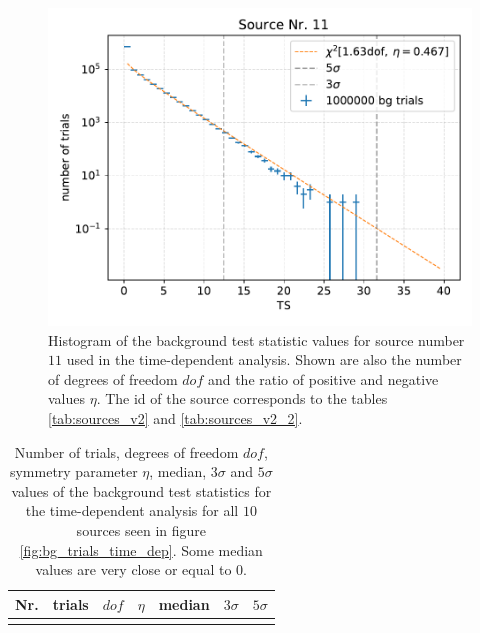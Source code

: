 \begin{figure}
    \centering
    \includegraphics[width=\linewidth]{Plots/05_csky/9_years_gfu_gold_time_dep_bg_t0_1.pdf}
    \caption{Histogram of the background test statistic values for source number $\num{11}$ used in the time-dependent analysis. Shown are also the number of degrees of freedom $dof$ and the ratio of positive and negative values $\eta$. The id of the source corresponds to the tables \ref{tab:sources_v2} and \ref{tab:sources_v2_2}.}
    \label{fig:bg_trials_time_dep_1}
\end{figure}
\begin{table}
  \centering
  \caption[]{Number of trials, degrees of freedom $dof$, symmetry parameter $\eta$, median, $\num{3}\sigma$ and $\num{5}\sigma$ values of the background test statistics for the time-dependent analysis for all $\num{10}$ sources seen in figure \ref{fig:bg_trials_time_dep}. Some median values are very close or equal to $\num{0}$.}
  \begin{tabular}{crccccc}
    \toprule
    Nr. & trials & $dof$ & $\eta$ & median & $\num{3}\sigma$ & $\num{5}\sigma$ \\
    \toprule
      
    \toprule
    \label{tab:sigma_time_dep}
  \end{tabular}
\end{table}
